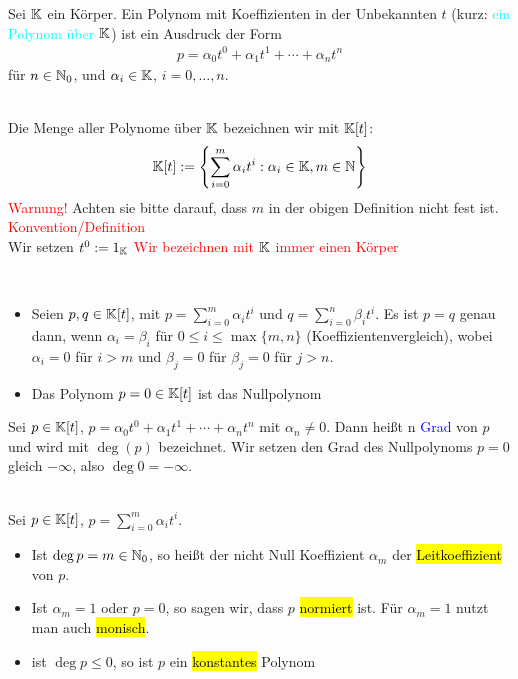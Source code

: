 \begin{definition}
Sei $\mathbb{K}$ ein Körper. 
Ein Polynom mit Koeffizienten in der Unbekannten $t$ (kurz: \textcolor{cyan}{ein Polynom über $\mathbb{K}$}) ist ein Ausdruck der Form
\begin{align*}
    p=\alpha_0t^0+\alpha_1t^1+\cdots+\alpha_nt^n
\end{align*}
für $n\in \mathbb{N}_0$, und $\alpha_i\in\mathbb{K}$, $i=0,\dots,n$.
\end{definition}

\begin{remark}[{Notation: $\K[t]$}]
\,\\Die Menge aller Polynome über $\mathbb{K}$ bezeichnen wir mit $\K[t]$:
\begin{align*}
    \mathbb{K}[t]:=\left\{\sum_{i=0}^{m}\alpha_it^i : \alpha_i\in\mathbb{K}, m\in\mathbb{N}\right\}
\end{align*}
\textcolor{red}{Warnung!} Achten sie bitte darauf, dass $m$ in der obigen Definition nicht fest ist.\\
\textcolor{red}{Konvention/Definition}\\
Wir setzen $t^0:=1_{\mathbb{K}}$
\textcolor{red}{Wir bezeichnen mit $\mathbb{K}$ immer einen Körper}
\end{remark}

\begin{remark}
\,
\begin{itemize}
    \item Seien $p,q\in\mathbb{K}[t]$, mit $p=\sum_{i=0}^m\alpha_it^i$ und $q=\sum_{i=0}^n\beta_it^i$. 
    Es ist $p=q$ genau dann, wenn $\alpha_i=\beta_i$ für $0\leq i \leq \max{\{m,n\}}$ (Koeffizientenvergleich), wobei $\alpha_i = 0$ für $i>m$ und $\beta_j = 0$ für $\beta_j=0$ für $j>n$.
    \item Das Polynom $p=0\in\mathbb{K}[t]$ ist das Nullpolynom
\end{itemize}
\end{remark}

\begin{definition}
Sei $p\in\mathbb{K}[t]$, $p=\alpha_0t^0+\alpha_1t^1+\cdots+\alpha_nt^n$ mit $\alpha_n\neq0$.
Dann heißt n \textcolor{blue}{Grad} von $p$ und wird mit $\deg(p)$ bezeichnet.
Wir setzen den Grad des Nullpolynoms $p=0$ gleich $-\infty$, also $\deg{0}=-\infty$.
\end{definition}

\begin{definition}\,
\\Sei $p\in\mathbb{K}[t]$, $p=\sum_{i=0}^m\alpha_it^i$.
\begin{itemize}
    \item Ist $\deg{p}=m\in\mathbb{N}_0$, so heißt der nicht Null Koeffizient $\alpha_m$ der \hl{Leitkoeffizient} von $p$.
    \item Ist $\alpha_m=1$ oder $p=0$, so sagen wir, dass $p$ \hl{normiert} ist. Für $\alpha_m=1$ nutzt man auch \hl{monisch}.
    \item ist $\deg{p}\leq0$, so ist $p$ ein \hl{konstantes} Polynom
\end{itemize}
\end{definition}

